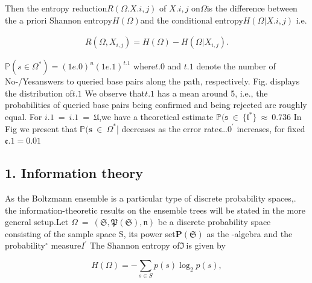 \documentclass{article}
\begin{document}
Then the entropy reduction$R ( \Omega. X . { i, j } )$ of $X . { i, j }$ on$\Omega$is the difference between
the a priori Shannon entropy$H ( \Omega )$and the conditional entropy$H ( \Omega | X . { i, j } )$ i.e.


\begin{equation}
\begin{array} { r } { R ( \Omega, X _ { i, j } ) = H ( \Omega ) - H ( \Omega | X _ { i, j } ). } \end{array}
\end{equation}


$\mathbb { P } ( s \in \Omega ^ { * } ) = ( 1e . { 0 } ) ^ { u } ( 1e . { 1 } ) ^ { t . { 1 } }$ where$t . { 0 }$ and $t . { 1 }$ denote the number of No-/Yesanswers to queried base pairs along the path, respectively. Fig. displays the
distribution of$t . { 1 }$ We observe that$t . { 1 }$ has a mean around 5, i.e., the probabilities
of queried base pairs being confirmed and being rejected are roughly equal.
For $i . { 1 } ~ = ~ i . { 1 } ~ = ~ \mathfrak { U }$,we have a theoretical estimate $\mathbb { P } ( \mathfrak { s } ~ \in ~ \{ \mathfrak { l } ^ { * } \} ~ \approx ~ 0. 7 3 6$ In Fig
we present that $\mathbb { P } ( \pmb { s } ~ \in ~ \Omega ^ { * }$| decreases as the error rate$\mathbf { \epsilon } . {. 0 } ^ { \prime }$ increases, for fixed
$\mathfrak { e . { 1 } } = 0. 0 1$


\subsection*{1. Information theory}


As the Boltzmann ensemble is a particular type of discrete probability spaces,.
the information-theoretic results on the ensemble trees will be stated in the more
general setup.Let $\Omega ~ = ~ ( { \mathfrak { S } }, { \mathfrak { P } } ( { \mathfrak { S } } ), { \mathfrak { n } } )$ be a discrete probability space consisting
of the sample space S, its power set$\mathbf { P } ( \mathfrak { S } )$ as the -algebra and the probability$^ \circ$
measure$I ^ { \prime }$ The Shannon entropy of$\Im ~$is given by


\begin{equation}
H ( \Omega ) = - \sum _ { s \in S } p ( s ) \log _ { 2 } p ( s ),
\end{equation}
\end{document}
